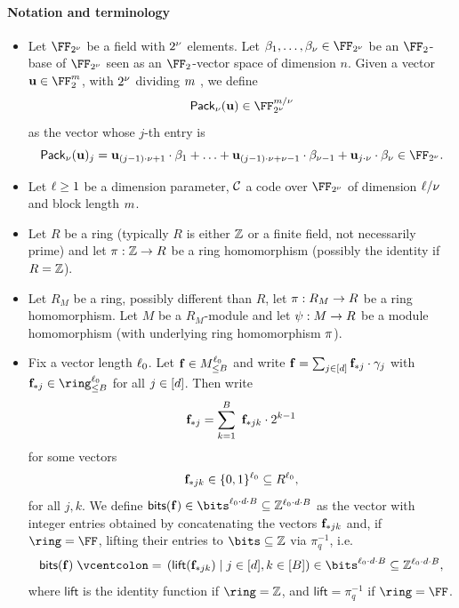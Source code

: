 \documentclass[11pt,letterpaper,usenames,dvipsnames]{article}
\begin{document}
\paragraph{Notation and terminology}
\begin{itemize}[leftmargin=*]
    \item Let $\comfield$ be a field with $2^{\nu}$ elements. Let
%
$
\beta_1, \ldots, \beta_\comfieldexp \in \comfield
$
%
be an $\FF_2$-base of $\comfield$ seen as an $\FF_2$-vector space of dimension $n$. Given a vector $\uu\in \FF_2^\codelength$, with $2^\nu$ dividing $m$ , we define
%
$$
\pack(\uu)\in \comfield^{\codelength/\comfieldexp}
$$
as the vector whose $j$-th entry is
%
$$
\pack(\uu)_{j} = \uu_{(j-1)\cdot \comfieldexp +1 }\cdot \beta_1 + \ldots + \uu_{(j-1)\cdot \comfieldexp +\comfieldexp-1 }\cdot \beta_{\comfieldexp-1}+\uu_{j \cdot \comfieldexp} \cdot \beta_\comfieldexp \in \comfield.
$$
%
\item 
 Let $\ell\geq 1$ be a dimension parameter, $\mathcal{C}$ a code over $\comfield$ of dimension $\ell/\nu$ and block length $m$.  
 \item 
 Let $R$ be a ring (typically $R$ is either $\mathbb{Z}$ or a finite field, not necessarily prime) and let $\pi:\mathbb{Z} \to R$ be a ring homomorphism (possibly the identity if $R=\mathbb{Z}$).
 \item Let $R_M$ be a ring, possibly different than $R$, let $\pi:R_M \to R$ be a ring homomorphism. Let $M$ be a $R_M$-module and  let $\psi: M \to R$ be a module homomorphism (with underlying ring homomorphism $\pi$).
\item 
Fix a vector length $\ell_0$. Let $\mathbf{f} \in M_{\leq B}^{\ell_0}$ and write %
$\mathbf{f}=\sum_{j\in [d]} \mathbf{f}_{*j}\cdot \gamma_j$
with $\bff_{*j}\in \ringbitbound{B}^{\codedim_0}$ for all $j\in [d]$. Then write $$\mathbf{f}_{*j}= \sum_{k=1}^{B}\  \mathbf{f}_{*jk}\cdot 2^{k-1} $$ for some vectors $$\mathbf{f}_{*jk}\in \{0,1\}^{\ell_0}\subseteq R^{\ell_0},$$ for all $j,k$.  We define   $\mathsf{bits}(\bff)\in \bits^{\codedim_0\cdot\moduledegree\cdot  B} \subseteq \ZZ^{\codedim_0\cdot\moduledegree\cdot B}$ as the vector with integer entries obtained by concatenating the vectors $\mathbf{f}_{*jk}$ and, if $\ring = \FF$, lifting their entries to $\bits \subseteq \ZZ$ via $\pi_q^{-1}$, i.e.\ \begin{equation}\label{e:bits_of_f}\mathsf{bits}(\bff) \defeq \left(\mathsf{lift}(\bff_{*jk})\mid  j\in [\moduledegree], k\in [B]\right)\in \bits^{\codedim_0\cdot\moduledegree\cdot B} \subseteq \ZZ^{\codedim_0\cdot\moduledegree\cdot B},\end{equation}
where $\mathsf{lift}$ is the identity function if $\ring=\ZZ$,  and  $\mathsf{lift} = \pi_q^{-1}$ if $\ring=\FF$.
\end{itemize}
 
\end{document}

